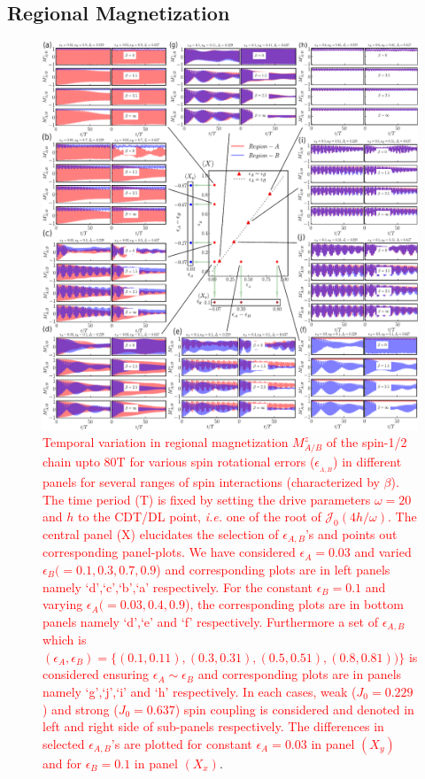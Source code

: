 \documentclass[12pt]{iopart}
\newcommand{\red}[1]{\textcolor{red}{#1}}
\begin{document}
\subsection{\label{sec:level42} Regional Magnetization}
\begin{figure}[t]
	\centering
	\includegraphics[width = 15.0cm]{figure8.pdf}
	\caption{\red{Temporal variation in regional magnetization $M^z_{A/B}$ of the spin-1/2 chain upto 80T for various spin rotational errors ($\epsilon_{_{A,B}}$) in different panels for  several ranges of spin interactions (characterized by $\beta$). The time period (T) is fixed by setting the drive parameters $\omega=20$ and $h$ to the CDT/DL point, \textit{i.e.} one of the root of $\mathcal{J}_0(4h/\omega)$. The central panel (X) elucidates the selection of $\epsilon_{A,B}$'s and points out corresponding panel-plots. We have considered $\epsilon_A = 0.03$ and varied $\epsilon_B(= 0.1, 0.3, 0.7,0.9$) and corresponding plots are in left panels namely `d',`c',`b',`a' respectively.  For the constant $\epsilon_B = 0.1$ and varying $\epsilon_A ( = 0.03, 0.4,0.9$), the corresponding plots are in bottom panels namely `d',`e' and `f' respectively. Furthermore a set of $\epsilon_{A,B}$ which is $ (\epsilon_{A},\epsilon_{B}) = \{(0.1,0.11), (0.3,0.31),(0.5,0.51),(0.8,0.81))\}$ is considered ensuring $\epsilon_A\sim \epsilon_B$ and corresponding plots are in panels namely `g',`j',`i' and `h' respectively. In each cases, weak ($J_0 = 0.229$) and strong ($J_0 = 0.637$) spin coupling  is considered and denoted in left and right side of sub-panels respectively. The differences in selected $\epsilon_{A,B}$'s are plotted for constant $\epsilon_A = 0.03$ in panel $(X_y)$ and for $\epsilon_B = 0.1$ in  panel $(X_x)$}.}
	\label{Fig:reg_mag_ea_eb}
\end{figure}
\end{document}
